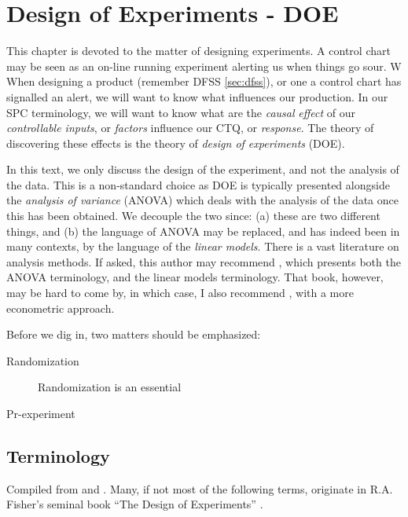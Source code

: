 \chapter{Design of Experiments - DOE}

This chapter is devoted to the matter of designing experiments.
A control chart may be seen as an on-line running experiment alerting us when things go sour. W
When designing a product (remember DFSS \ref{sec:dfss}), or one a control chart has signalled an alert, we will want to know what influences our production.
In our SPC terminology, we will want to know what are the \emph{causal} \emph{effect} of our \emph{controllable inputs}, or \emph{factors} influence our CTQ, or \emph{response}. 
The theory of discovering these effects is the theory of \emph{design of experiments} (DOE).

\begin{remark}
In this text, we only discuss the design of the experiment, and not the analysis of the data.
This is a non-standard choice as DOE is typically presented alongside the \emph{analysis of variance} (ANOVA) which deals with the analysis of the data once this has been obtained.
We decouple the two since: 
(a) these are two different things, and 
(b) the language of ANOVA may be replaced, and has indeed been in many contexts, by the language of the \emph{linear models}.
There is a vast literature on analysis methods. 
If asked, this author may recommend \cite{hocking_analysis_1985}, which presents both the ANOVA terminology, and the linear models terminology.
That book, however, may be hard to come by, in which case, I also recommend \cite{greene_econometric_2003}, with a more econometric approach.
\end{remark}


Before we dig in, two matters should be emphasized:
\begin{description}
\item [Randomization] Randomization is an essential 
\item [Pr-experiment]
\end{description}


\section{Terminology}
Compiled from \cite{natrella_nist/sematech_2010} and \cite{mason_statistical_2003}.
Many, if not most of the following terms, originate in R.A. Fisher's seminal book ``The Design of Experiments'' \citep{fisher_design_1960}.


